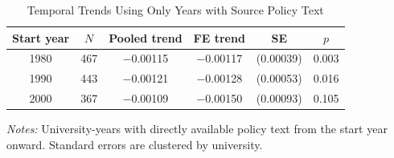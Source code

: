 \begin{table}[htbp]
\centering
\small
\caption{Temporal Trends Using Only Years with Source Policy Text}
\label{tab:observed-trends}
\begin{threeparttable}
\begin{tabular}{cccccc}
\toprule
Start year & $N$ & Pooled trend & FE trend & SE & $p$ \\
\midrule
1980 & 467 & $-$0.00115 & $-$0.00117 & (0.00039) & 0.003 \\
1990 & 443 & $-$0.00121 & $-$0.00128 & (0.00053) & 0.016 \\
2000 & 367 & $-$0.00109 & $-$0.00150 & (0.00093) & 0.105 \\
\bottomrule
\end{tabular}
\begin{tablenotes}[flushleft]\footnotesize
\item \textit{Notes:} University-years with directly available policy text from the start year onward. Standard errors are clustered by university.
\end{tablenotes}
\end{threeparttable}
\end{table}
